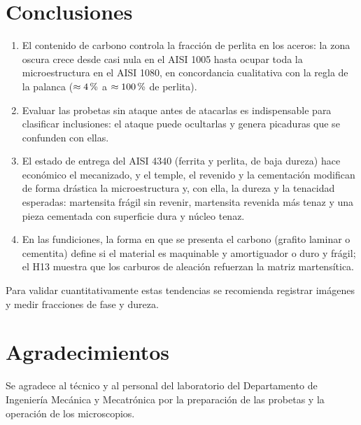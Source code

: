 \documentclass[journal,11pt]{IEEEtran}
\newcommand{\pct}{\ifmmode\mskip\thinmuskip\mathchar"0025\relax\else\,\char37\relax\fi}
\begin{document}
\section{Conclusiones}
\begin{enumerate}
    \item El contenido de carbono controla la fracción de perlita en los aceros: la zona oscura crece desde casi nula en el AISI 1005 hasta ocupar toda la microestructura en el AISI 1080, en concordancia cualitativa con la regla de la palanca ($\approx4\pct$ a $\approx100\pct$ de perlita).
    \item Evaluar las probetas sin ataque antes de atacarlas es indispensable para clasificar inclusiones: el ataque puede ocultarlas y genera picaduras que se confunden con ellas.
    \item El estado de entrega del AISI 4340 (ferrita y perlita, de baja dureza) hace económico el mecanizado, y el temple, el revenido y la cementación modifican de forma drástica la microestructura y, con ella, la dureza y la tenacidad esperadas: martensita frágil sin revenir, martensita revenida más tenaz y una pieza cementada con superficie dura y núcleo tenaz.
    \item En las fundiciones, la forma en que se presenta el carbono (grafito laminar o cementita) define si el material es maquinable y amortiguador o duro y frágil; el H13 muestra que los carburos de aleación refuerzan la matriz martensítica.
\end{enumerate}
Para validar cuantitativamente estas tendencias se recomienda registrar imágenes y medir fracciones de fase y dureza.

\section*{Agradecimientos}
Se agradece al técnico y al personal del laboratorio del Departamento de Ingeniería Mecánica y Mecatrónica por la preparación de las probetas y la operación de los microscopios.
\end{document}
